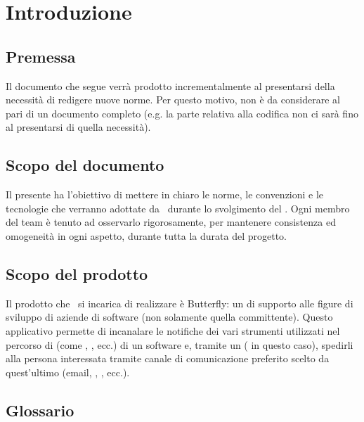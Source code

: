 \section{Introduzione}

\subsection{Premessa}
    Il documento che segue verrà prodotto incrementalmente al presentarsi della necessità di redigere nuove norme.
    Per questo motivo, non è da considerare al pari di un documento completo (e.g. la parte relativa alla codifica non ci sarà fino
    al presentarsi di quella necessità).

\subsection{Scopo del documento}
    Il presente  ha l’obiettivo di mettere in chiaro le norme, le convenzioni e le tecnologie
    che verranno adottate da \gruppo\ durante lo svolgimento del . Ogni membro del team
    \`e tenuto ad osservarlo rigorosamente, per mantenere consistenza ed omogeneit\`a in ogni aspetto, durante tutta la durata del progetto.\par

 \subsection{Scopo del prodotto}
 	Il prodotto che \gruppo\ si incarica di realizzare è Butterfly: un  di supporto alle figure di	sviluppo di aziende di software (non solamente quella committente). Questo applicativo permette di incanalare le notifiche dei vari strumenti utilizzati nel percorso di  (come , , ecc.) di un software e, tramite un  ( in questo caso), spedirli alla persona interessata tramite canale di comunicazione preferito scelto da quest’ultimo (email, , , ecc.).

\subsection{Glossario}


